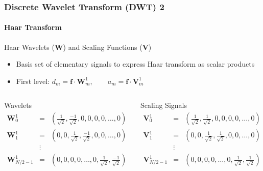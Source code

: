 \documentclass[9pt]{beamer}
\begin{document}
\begin{frame}
\frametitle{Discrete Wavelet Transform (DWT) \hfill{2}}
\framesubtitle{Haar Transform}
\begin{block}{Haar Wavelets ($\mathbf{W}$) and Scaling Functions ($\mathbf{V}$)}
            \begin{itemize}
            \item Basis set of elementary signals to express Haar transform as scalar products
            \item First level: $d_{m} = \mathbf{f} \cdot \mathbf{W}_{m}^{1}, \qquad a_{m} = \mathbf{f} \cdot \mathbf{V}_{m}^{1}$
            \end{itemize}
\end{block}

\pause

\begin{columns}
\begin{block}{Wavelets}
{\scriptsize
\begin{eqnarray*}
\mathbf{W}_{0}^{1} & = &\left( \frac{1}{\sqrt{2}},\frac{-1}{\sqrt{2}},0,0,0,0,\ldots,0 \right) \\
\mathbf{W}_{1}^{1} & = & \left( 0,0,\frac{1}{\sqrt{2}},\frac{-1}{\sqrt{2}},0,0,\ldots,0 \right) \\
	 & \vdots &  \\
\mathbf{W}_{N/2-1}^{1} & = & \left( 0,0,0,0,\ldots,0,\frac{1}{\sqrt{2}},\frac{-1}{\sqrt{2}} \right) 
\end{eqnarray*}
}
\end{block}

\pause

\begin{block}{Scaling Signals}
{\scriptsize
\begin{eqnarray*}
\mathbf{V}_{0}^{1} & = &\left( \frac{1}{\sqrt{2}},\frac{1}{\sqrt{2}},0,0,0,0,\ldots,0 \right) \\
\mathbf{V}_{1}^{1} & = & \left( 0,0,\frac{1}{\sqrt{2}},\frac{1}{\sqrt{2}},0,0,\ldots,0 \right) \\
	 & \vdots & \\
\mathbf{V}_{N/2-1}^{1} & = & \left( 0,0,0,0,\ldots,0,\frac{1}{\sqrt{2}},\frac{1}{\sqrt{2}} \right) 
\end{eqnarray*}
}
\end{block}
\end{columns}
\end{frame}
\end{document}
